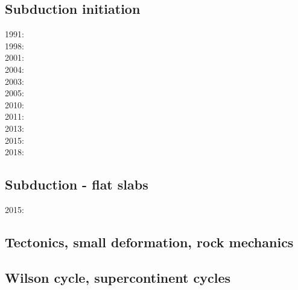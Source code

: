 \subsection*{Subduction initiation}

1991: \cite{muph91}\\
1998: \cite{togu98}\\
2001: \cite{dohe01}\cite{reyb01}\cite{brry01}\\
2004: \cite{ster04}\\
2003: \cite{hags03}\\
2005: \cite{bihi05}\\
2010: \cite{nigm10}\cite{bucl10}\\
2011: \cite{bagw11}\\
2013: \cite{dyge13}\\
2015: \cite{matv15}\\
2018: \cite{zhlg18}

\subsection*{Subduction - flat slabs}

2015: \cite{gehm15}

\subsection*{Tectonics, small deformation, rock mechanics}

\cite{ilma93}
\cite{hept96}
\cite{lega12}

\subsection*{Wilson cycle, supercontinent cycles}

\cite{trry95}
\cite{zhzl07}
\cite{zhzm09}





